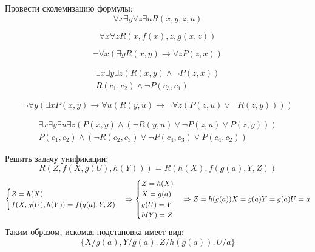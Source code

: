 \documentclass[11pt]{article}
\newcounter{th}\setcounter{th}{0}
\begin{document}
Провести сколемизацию формулы:
\begin{equation*}
\forall x \exists y \forall z \exists u R(x, y, z, u)
\end{equation*}

\begin{equation*}
\forall x \forall z R(x, f(x), z, g(x, z))
\end{equation*}

\begin{equation*}
\lnot \forall x (\exists y R(x, y) \to \forall z P(z, x))
\end{equation*}

\begin{gather*}
\exists x \exists y \exists z(R(x, y) \land \lnot P(z, x)) \\
R(c_1, c_2) \land \lnot P(c_3, c_1)
\end{gather*}

\begin{equation*}
\lnot \forall y (\exists x P(x, y) \to \forall u (R(y, u) \to \lnot \forall z (P(z, u) \lor \lnot R(z, y))))
\end{equation*}

\begin{gather*}
\exists x \exists y \exists u \exists z (P(x, y) \land (\lnot R(y, u) \lor \lnot P(z, u) \lor P(z, y))) \\
P(c_1, c_2) \land (\lnot R(c_2, c_3) \lor \lnot P(c_4, c_3) \lor P(c_4, c_2))
\end{gather*}

Решить задачу унификации:
\begin{equation*}
R(Z, f(X, g(U), h(Y))) = R(h(X), f(g(a), Y, Z))
\end{equation*}
\begin{equation*}
\begin{cases}
Z = h(X) \\
f(X, g(U), h(Y)) = f(g(a), Y, Z)
\end{cases}
\Rightarrow
\begin{cases}
Z = h(X) \\
X = g(a) \\
g(U) = Y \\
h(Y) = Z \\
\end{cases}
\Rightarrow
Z = h(g(a)) \\
X = g(a) \\
Y = g(a) \\
U = a
\end{equation*}
Таким образом, искомая подстановка имеет вид:
\begin{equation*}
\{X/g(a), Y/g(a), Z/h(g(a)), U/a\}
\end{equation*}
\end{document}
